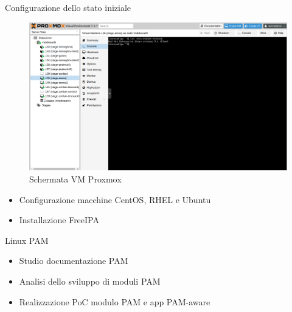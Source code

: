 \documentclass{beamer}
\begin{document}
	\begin{frame}{Configurazione dello stato iniziale}
		\begin{figure}[H] 
			\centering 
			\includegraphics[width=0.6\columnwidth]{immagini/proxmox.png} 
			\caption{Schermata VM Proxmox}
			\label{fig:proxmox}
		\end{figure}
		
		\begin{itemize}
			\item Configurazione macchine CentOS, RHEL e Ubuntu \vspace{.5em}
			\item Installazione FreeIPA \vspace{.5em}
		\end{itemize}
		
	\end{frame}
	
	\begin{frame}{Linux PAM}
				
		\begin{itemize}
			\item Studio documentazione PAM \vspace{.5em}
			\item Analisi dello sviluppo di moduli PAM \vspace{.5em}
			\item Realizzazione PoC modulo PAM e app PAM-aware \vspace{.5em}
		\end{itemize}
		
	\end{frame}
	
\end{document}
